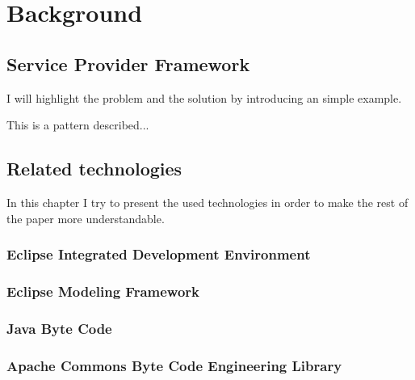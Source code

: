 \chapter{Background}

\section{Service Provider Framework}
\cite{Bloch08}
I will highlight the problem and the solution by introducing an simple example. 

This is a pattern described...



\section{Related technologies}
In this chapter I try to present the used technologies in order to make the rest of the paper more understandable.

\subsection{Eclipse Integrated Development Environment}

\subsection{Eclipse Modeling Framework}


\subsection{Java Byte Code}

\subsection{Apache Commons Byte Code Engineering Library}


